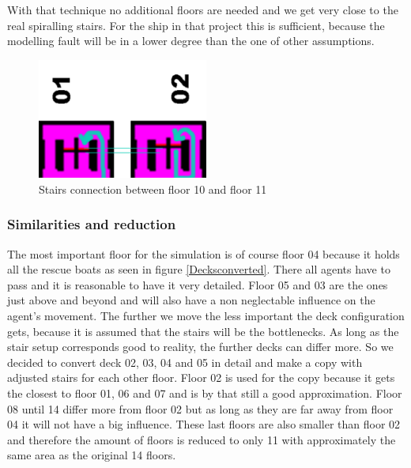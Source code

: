 \documentclass[11pt]{article}
\begin{document}
With that technique no additional floors are needed and we get very close to the real spiralling stairs. For the ship in that project this is sufficient, because the modelling fault will be in a lower degree than the one of other assumptions.

\begin{figure}[H]
\centering
{\begin{minipage}[t]{7.4cm}
\includegraphics [width=0.5\textwidth]{Decktwostairs.pdf}
\caption{Stairs connection between floor 10 and floor 11}
\label{Decktwostairs}
\end{minipage}}
\end{figure}

\subsubsection{Similarities and reduction}
The most important floor for the simulation is of course floor 04 because it holds all the rescue boats as seen in figure \ref{Decksconverted}. There all agents have to pass and it is reasonable to have it very detailed. Floor 05 and 03 are the ones just above and beyond and will also have a non neglectable influence on the agent’s movement.
\newline
The further we move the less important the deck configuration gets, because it is assumed that the stairs will be the bottlenecks. As long as the stair setup corresponds good to reality, the further decks can differ more.
So we decided to convert deck 02, 03, 04 and 05 in detail and make a copy with adjusted stairs for each other floor. Floor 02 is used for the copy because it gets the closest to floor 01, 06 and 07 and is by that still a good approximation.
\newline
Floor 08 until 14 differ more from floor 02 but as long as they are far away from floor 04 it will not have a big influence. These last floors are also smaller than floor 02 and therefore the amount of floors is reduced to only 11 with approximately the same area as the original 14 floors.
\end{document}
